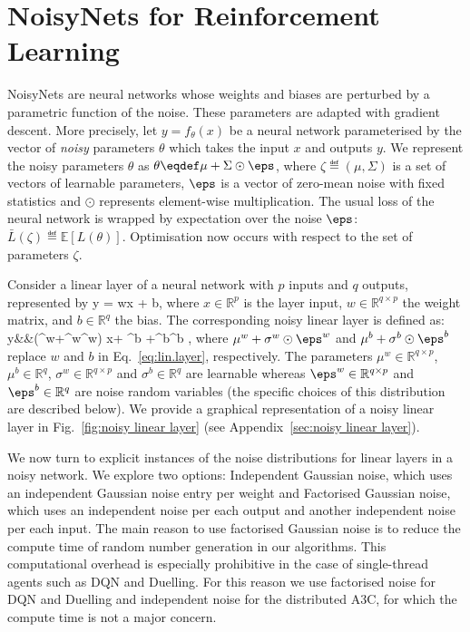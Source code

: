 \documentclass{article}
\begin{document}
\section{NoisyNets for Reinforcement Learning}
\label{sec:noisynets}

NoisyNets are neural networks whose weights and biases are perturbed by a parametric function of the noise. These parameters are adapted with gradient descent. More precisely, let $y=f_\theta(x)$ be a neural network parameterised by the vector of \emph{noisy} parameters $\theta$ which takes the input $x$ and outputs $y$.  We represent the noisy parameters $\theta$ as $\theta \eqdef \mu +\Sigma\odot\eps$, where  $\zeta\eqdef(\mu,\Sigma)$ is a set of vectors of learnable parameters, $\eps$ is a vector of zero-mean noise with fixed statistics and  $\odot$ represents element-wise multiplication. The usual loss of the neural network is wrapped by expectation over the noise $\eps$: $\bar L(\zeta) \eqdef \mathbb{E}\left[L(\theta)\right]$. Optimisation now occurs with respect to the set of parameters $\zeta$.

Consider a linear layer of a neural network with $p$ inputs and $q$ outputs, represented by 
%
\beq
\label{eq:lin.layer}
y = wx + b,
\eeq
%
where $x\in \mathbb{R}^{p}$ is the layer input, $w\in\mathbb{R}^{q\times p}$ the weight matrix, and $b\in\mathbb{R}^q$ the bias.
The corresponding noisy linear layer is defined as:
\beqa
\label{eq:param}
y&\eqdef&(\mu^w+\sigma^w\odot\eps^w) x+ \mu^b  +\sigma^b\odot\eps^b ,
\eeqa
 where  $\mu^w+\sigma^w\odot\eps^w$ and $\mu^b  +\sigma^b\odot\eps^b$ replace $w$ and $b$ in Eq.~\eqref{eq:lin.layer}, respectively.  The parameters $\mu^w\in \mathbb{R}^{q\times p}$, $\mu^b\in \mathbb{R}^{q}$, $\sigma^w\in \mathbb{R}^{q\times p}$ and $\sigma^b\in \mathbb{R}^{q}$ are learnable whereas $\eps^w\in \mathbb{R}^{q\times p}$  and $\eps^b\in \mathbb{R}^{q}$ are noise random variables (the specific choices of this distribution are described below). We provide a graphical representation of a noisy linear layer in Fig.~\ref{fig:noisy linear layer} (see Appendix~\ref{sec:noisy linear layer}). 

We now turn to explicit instances of the noise distributions for linear layers in a noisy network. We explore two options: Independent Gaussian noise, which uses an independent Gaussian noise entry per weight and Factorised Gaussian noise, which uses an independent noise per each output and another independent noise per each input. The main reason to use factorised Gaussian noise is to reduce the compute time of random number generation in our algorithms. This computational overhead is especially prohibitive in the case of single-thread agents such as DQN and Duelling. For this reason we use factorised noise for DQN and Duelling and independent noise for the distributed A3C, for which the compute time is not a major concern.
\end{document}
